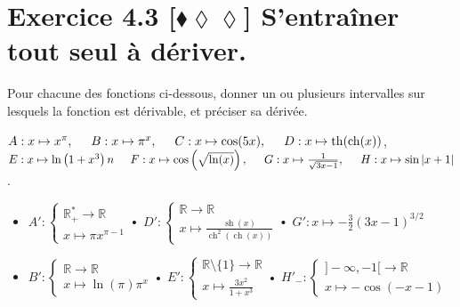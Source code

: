 \documentclass[10pt]{article}
\DeclareMathOperator{\ch}{ch}
\DeclareMathOperator{\sh}{sh}
\DeclareMathOperator{\tah}{th}
\begin{document}
\section*{Exercice 4.3 [$\blacklozenge\lozenge\lozenge$] S'entraîner tout seul à dériver.}
\begin{tcolorbox}[enhanced, width=7in, center, size=fbox, fontupper=\large, drop shadow southwest]
    Pour chacune des fonctions ci-dessous, donner un ou plusieurs intervalles sur lesquels la fonction est dérivable, et préciser sa dérivée.
    \begin{center}
        $A:x\mapsto x^\pi,\hspace{0.5cm}B:x\mapsto\pi^x,\hspace{0.5cm}C:x\mapsto\cos(5x),\hspace{0.5cm}D:x\mapsto\tah(\ch(x))$,\\
        $E:x\mapsto\ln\left(1+x^3\right)n\hspace{0.5cm}F:x\mapsto\cos\left(\sqrt{\ln(x)}\right),\hspace{0.5cm}G:x\mapsto\frac{1}{\sqrt{3x-1}},\hspace{0.5cm}H:x\mapsto\sin|x+1|$.
    \end{center}
    \begin{itemize}
        \item $A':\begin{cases}\mathbb{R}^*_+\rightarrow\mathbb{R}\\x\mapsto\pi x^{\pi-1}\end{cases}$\hspace{1.8cm}• $D':\begin{cases}\mathbb{R}\rightarrow\mathbb{R}\\x\mapsto\frac{\sh(x)}{\ch^2(\ch(x))}\end{cases}$\hspace{1.6cm}• $G':x\mapsto-\frac{3}{2}(3x-1)^{3/2}$
        \item $B':\begin{cases}\mathbb{R}\rightarrow\mathbb{R}\\x\mapsto\ln(\pi)\pi^x\end{cases}$\hspace{1.5cm}• $E':\begin{cases}\mathbb{R}\setminus\{1\}\rightarrow\mathbb{R}\\x\mapsto\frac{3x^2}{1+x^3}\end{cases}$\hspace{1.6cm}• $H'_-:\begin{cases}]-\infty,-1[\rightarrow\mathbb{R}\\x\mapsto-\cos(-x-1)\end{cases}$

\end{itemize}
\end{tcolorbox}
\end{document}
